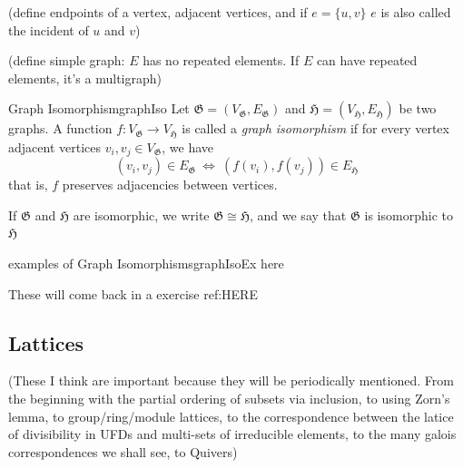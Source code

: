 \documentclass{book}
\newcommand{\rw}{\rightarrow}
\newcommand{\LRw}{\Leftrightarrow}
\begin{document}
(define endpoints of a vertex, adjacent vertices, and if $e = \{u,v\}$ $e$ is also called the incident of $u$ and $v$)

(define simple graph: $E$ has no repeated elements. If $E$ can have repeated elements, it's a multigraph)


\begin{defn}{Graph Isomorphism}{graphIso}
	Let $\mathfrak{G} = (V_{\mathfrak{G}}, E_{\mathfrak{G}})$ and $\mathfrak{H} = (V_{\mathfrak{H}}, E_{\mathfrak{H}})$
	be two graphs. A function $f: V_\mathfrak{G} \rw V_\mathfrak{H}$ is called a \emph{graph isomorphism} if for every
	vertex adjacent vertices $v_i, v_j \in V_{\mathfrak{G}}$, we have
	\[
		(v_i, v_j) \in E_{\mathfrak{G}}\ \LRw\ (f(v_i), f(v_j)) \in E_{\mathfrak{H}}
	\]
	that is, $f$ preserves adjacencies between vertices.

	If $\mathfrak{G}$ and $\mathfrak{H}$ are isomorphic, we write $\mathfrak{G} \cong \mathfrak{H}$, and we say that
	$\mathfrak{G}$ is isomorphic to $\mathfrak{H}$
\end{defn}

\begin{example}{examples of Graph Isomorphisms}{graphIsoEx}
	here
\end{example}

These will come back in a exercise ref:HERE
\subsection{Lattices}\label{sec:lattice}

(These I think are important because they will be periodically mentioned. From the beginning with the partial ordering
of subsets via inclusion, to using Zorn's lemma, to group/ring/module lattices, to the correspondence between the latice of divisibility in UFDs and
multi-sets of irreducible elements, to the many galois correspondences we shall see, to Quivers)
\end{document}
